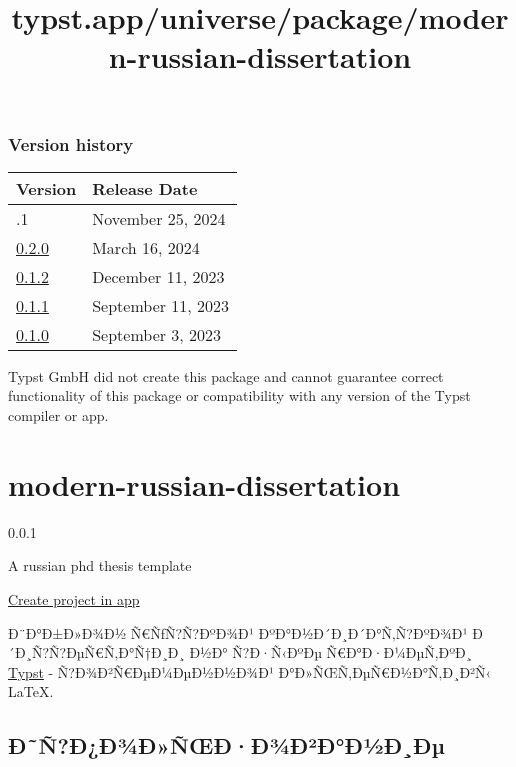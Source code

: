 \label{versions}
\subsubsection{Version history}\label{version-history}

\begin{longtable}[]{@{}ll@{}}
\toprule\noalign{}
Version & Release Date \\
\midrule\noalign{}
\endhead
\bottomrule\noalign{}
\endlastfoot
0.2.1 & November 25, 2024 \\
\href{https://typst.app/universe/package/drafting/0.2.0/}{0.2.0} & March
16, 2024 \\
\href{https://typst.app/universe/package/drafting/0.1.2/}{0.1.2} &
December 11, 2023 \\
\href{https://typst.app/universe/package/drafting/0.1.1/}{0.1.1} &
September 11, 2023 \\
\href{https://typst.app/universe/package/drafting/0.1.0/}{0.1.0} &
September 3, 2023 \\
\end{longtable}

Typst GmbH did not create this package and cannot guarantee correct
functionality of this package or compatibility with any version of the
Typst compiler or app.


\title{typst.app/universe/package/modern-russian-dissertation}

\label{banner}
\label{template-thumbnail}

\section{modern-russian-dissertation}\label{modern-russian-dissertation}

{ 0.0.1 }

A russian phd thesis template

\href{/app?template=modern-russian-dissertation&version=0.0.1}{Create
project in app}

\label{readme}
Ð¨Ð°Ð±Ð»Ð¾Ð½ Ñ€ÑƒÑ?Ñ?ÐºÐ¾Ð¹ ÐºÐ°Ð½Ð´Ð¸Ð´Ð°Ñ‚Ñ?ÐºÐ¾Ð¹
Ð´Ð¸Ñ?Ñ?ÐµÑ€Ñ‚Ð°Ñ†Ð¸Ð¸ Ð½Ð° Ñ?Ð·Ñ‹ÐºÐµ Ñ€Ð°Ð·Ð¼ÐµÑ‚ÐºÐ¸
\href{https://typst.app/}{Typst} - Ñ?Ð¾Ð²Ñ€ÐµÐ¼ÐµÐ½Ð½Ð¾Ð¹
Ð°Ð»ÑŒÑ‚ÐµÑ€Ð½Ð°Ñ‚Ð¸Ð²Ñ‹ LaTeX.

\subsection{Ð˜Ñ?Ð¿Ð¾Ð»ÑŒÐ·Ð¾Ð²Ð°Ð½Ð¸Ðµ}\label{uxf0uxf1uxf0uxf0uxbeuxf0uxf1ux153uxf0uxf0uxbeuxf0uxb2uxf0uxf0uxbduxf0uxf0uxb5}


